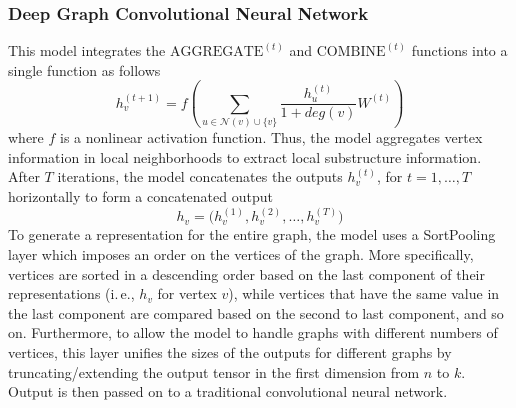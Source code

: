 \documentclass[twoside,11pt]{article}
\newcommand{\ie}{i.\,e., }
\begin{document}
\subsubsection{Deep Graph Convolutional Neural Network}
This model integrates the $\text{AGGREGATE}^{(t)}$ and $\text{COMBINE}^{(t)}$ functions into a single function as follows
\begin{equation}
  h_v^{(t+1)} = f \left( \sum_{u \in \mathcal{N}(v) \cup \{v\}} \frac{h_u^{(t)}}{1+deg(v)} W^{(t)} \right)
\end{equation}
where $f$ is a nonlinear activation function.
Thus, the model aggregates vertex information in local neighborhoods to extract local substructure information.
After $T$ iterations, the model concatenates the outputs $h_v^{(t)}$, for $t=1,\ldots,T$ horizontally to form a concatenated output
\begin{equation}
  h_v = \big( h_v^{(1)}, h_v^{(2)}, \ldots, h_v^{(T)} \big)
\end{equation}
To generate a representation for the entire graph, the model uses a SortPooling layer which imposes an order on the vertices of the graph.
More specifically, vertices are sorted in a descending order based on the last component of their representations (\ie $h_v$ for vertex $v$), while vertices that have the same value in the last component are compared based on the second to last component, and so on.
Furthermore, to allow the model to handle graphs with different numbers of vertices, this layer unifies the sizes of the outputs for different graphs by truncating/extending the output tensor in the first dimension from $n$ to $k$.
Output is then passed on to a traditional convolutional neural network.
\end{document}
